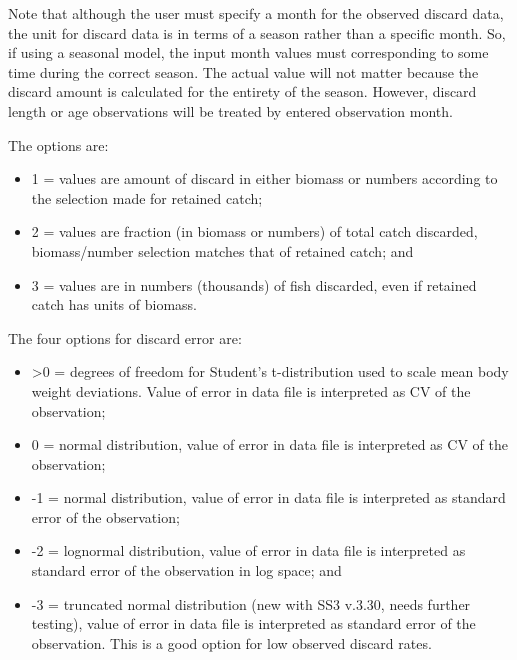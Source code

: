 Note that although the user must specify a month for the observed discard data, the unit for discard data is in terms of a season rather than a specific month. So, if using a seasonal model, the input month values must corresponding to some time during the correct season. The actual value will not matter because the discard amount is calculated for the entirety of the season.  However, discard length or age observations will be treated by entered observation month.
	
The options are:
\begin{itemize}
	\item 1 = values are amount of discard in either biomass or numbers according to the selection made for retained catch;
	\item 2 = values are fraction (in biomass or numbers) of total catch discarded, biomass/number selection matches that of retained catch; and
	\item 3 = values are in numbers (thousands) of fish discarded, even if retained catch has units of biomass.
\end{itemize}

The four options for discard error are:
\begin{itemize}
	\item >0 = degrees of freedom for Student's t-distribution used to scale mean body weight deviations.  Value of error in data file is interpreted as CV of the observation;
	\item 0 = normal distribution, value of error in data file is interpreted as CV of the observation;
	\item -1 = normal distribution, value of error in data file is interpreted as standard error of the observation;
	\item -2 = lognormal distribution, value of error in data file is interpreted as standard error of the observation in log space; and 
	\item -3 = truncated normal distribution (new with SS3 v.3.30, needs further testing), value of error in data file is interpreted as standard error of the observation.  This is a good option for low observed discard rates.
\end{itemize}

